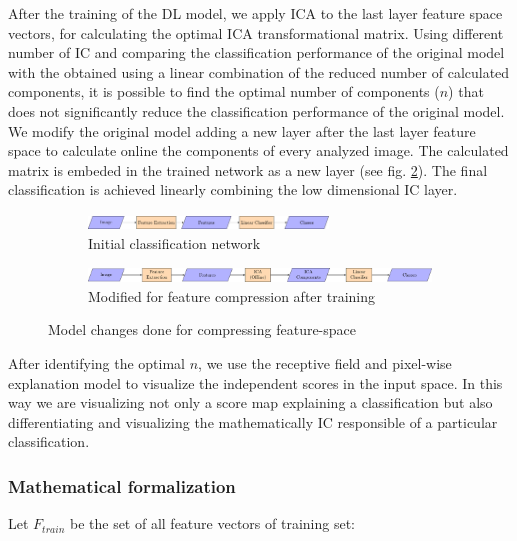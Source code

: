 \documentclass[review]{elsarticle}
\theoremstyle{definition} %
\theoremstyle{remark}
\begin{document}
After the training of the DL model, we apply ICA to the last layer feature space vectors, for calculating the optimal ICA transformational matrix. Using different number of IC and comparing the classification performance of the original model with the obtained using a linear combination of the reduced number of calculated components, it is possible to find the optimal number of components ($n$) that does not significantly reduce the classification performance of the original model. We modify the original model adding a new layer after the last layer feature space to calculate online the components of every analyzed image. The calculated matrix is embeded in the trained network as a new layer (see fig. \ref{fig:models}). The final classification is achieved linearly combining the low dimensional IC layer. 

\begin{figure}[h!]
	\centering
	\begin{subfigure}[b]{\textwidth}
		\centering
		\includegraphics[width=0.7\textwidth]{./figures/initial_classifier.pdf}
		\caption{Initial classification network}	
	\end{subfigure}
	\hfill   
	\begin{subfigure}[b]{\textwidth}
		\centering
		\includegraphics[width=\textwidth]{./figures/ica_classifier.pdf}
		\caption{Modified for feature compression after training}
		\label{fig:models_ica}
	\end{subfigure}
	\caption{Model changes done for compressing feature-space}  
	\label{fig:models} 
\end{figure}

After identifying the optimal $n$, we use the receptive field and pixel-wise explanation model \cite{de2017deep} to visualize the independent scores in the input space. In this way we are visualizing not only a score map explaining a classification but also differentiating and visualizing the mathematically IC responsible of a particular classification. 

\subsubsection{Mathematical formalization}

Let $F_{train}$ be the set of all feature vectors of training set:
\end{document}
